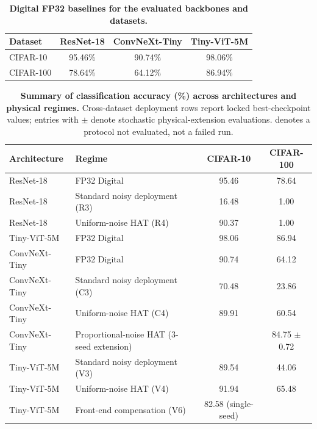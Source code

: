 \begin{table}[ht]
    \centering
    \caption{\textbf{Digital FP32 baselines for the evaluated backbones and datasets.}}
    \label{tab:supp-fp32-baselines}
    \begin{tabular}{lccc}
        \toprule
        \textbf{Dataset} & \textbf{ResNet-18} & \textbf{ConvNeXt-Tiny} & \textbf{Tiny-ViT-5M} \\
        \midrule
        CIFAR-10 & 95.46\% & 90.74\% & 98.06\% \\
        CIFAR-100 & 78.64\% & 64.12\% & 86.94\% \\
        \bottomrule
    \end{tabular}
\end{table}

\begin{table}[ht]
    \centering
    \caption{\textbf{Summary of classification accuracy (\%) across architectures and physical regimes.} Cross-dataset deployment rows report locked best-checkpoint values; entries with $\pm$ denote stochastic physical-extension evaluations. \notrun{} denotes a protocol not evaluated, not a failed run.}
    \label{tab:supp-result-summary}
    \small
    \begin{tabular}{llcc}
        \toprule
        \textbf{Architecture} & \textbf{Regime} & \textbf{CIFAR-10} & \textbf{CIFAR-100} \\
        \midrule
        ResNet-18 & FP32 Digital & 95.46 & 78.64 \\
        ResNet-18 & Standard noisy deployment (R3) & 16.48 & 1.00 \\
        ResNet-18 & Uniform-noise HAT (R4) & 90.37 & 1.00 \\
        Tiny-ViT-5M & FP32 Digital & 98.06 & 86.94 \\
        ConvNeXt-Tiny & FP32 Digital & 90.74 & 64.12 \\
        ConvNeXt-Tiny & Standard noisy deployment (C3) & 70.48 & 23.86 \\
        ConvNeXt-Tiny & Uniform-noise HAT (C4) & 89.91 & 60.54 \\
        ConvNeXt-Tiny & Proportional-noise HAT (3-seed extension) & \notrun{} & 84.75 $\pm$ 0.72 \\
        \midrule
        Tiny-ViT-5M & Standard noisy deployment (V3) & 89.54 & 44.06 \\
        Tiny-ViT-5M & Uniform-noise HAT (V4) & 91.94 & 65.48 \\
        Tiny-ViT-5M & Front-end compensation (V6) & 82.58 (single-seed) & \notrun{} \\
        \bottomrule
    \end{tabular}
\end{table}

